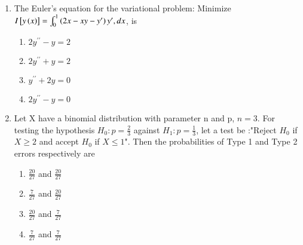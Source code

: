 \documentclass[journal]{IEEEtran}
\begin{document}
\begin{enumerate}
\item The Euler's equation for the variational problem: Minimize \\$I{}\left[y\left(x\right)\right] = \int_0^1 \left(2x - xy - y^{\prime}\right) y^{\prime}, dx$, is 
\begin{multicols}{2}
    \begin{enumerate}
        \item $2y^{{\prime}{\prime}} - y = 2$
        \item $2y^{{\prime}{\prime}} + y = 2$
        \item $y^{{\prime}{\prime}} + 2y = 0$
        \item $2y^{{\prime}{\prime}} - y = 0$
    \end{enumerate}
\end{multicols}
\item Let X have a binomial distribution with parameter n and p, $n=3$. For testing the hypothesis $H_0:p=\frac{2}{3}$ against $H_1:p=\frac{1}{3}$, let a test be :"Reject $H_0$ if $X\geq2$ and accept $H_0$ if $X\leq 1$". Then the probabilities of Type 1 and Type 2 errors respectively are 
\begin{multicols}{2}
    \begin{enumerate}
        \item $\frac{20}{27}$ and $\frac{20}{27}$
        \item $\frac{7}{27}$ and $\frac{20}{27}$
        \item $\frac{20}{27}$ and $\frac{7}{27}$
        \item $\frac{7}{27}$ and $\frac{7}{27}$
    \end{enumerate}
\end{multicols}
\end{enumerate}
\end{document}
